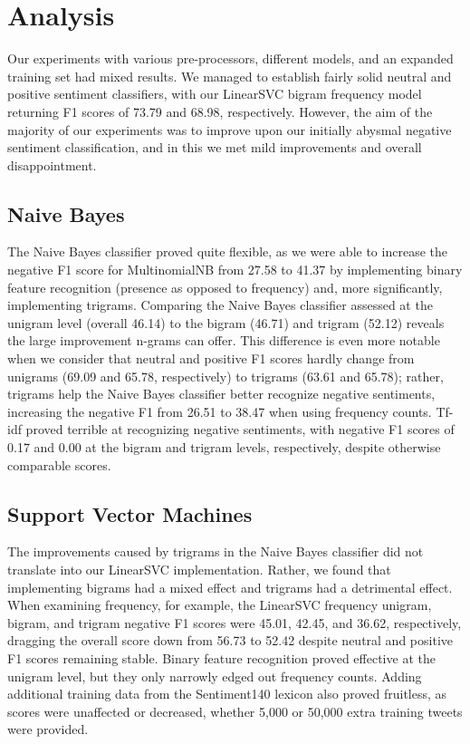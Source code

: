 \section{Analysis}
Our experiments with various pre-processors, different models, and an expanded training set had mixed results. We managed to establish fairly solid neutral and positive sentiment classifiers, with our LinearSVC bigram frequency model returning F1 scores of 73.79 and 68.98, respectively. However, the aim of the majority of our experiments was to improve upon our initially abysmal negative sentiment classification, and in this we met mild improvements and overall disappointment. 

\subsection{Naive Bayes}
The Naive Bayes classifier proved quite flexible, as we were able to increase the negative F1 score for MultinomialNB from 27.58 to 41.37 by implementing binary feature recognition (presence as opposed to frequency) and, more significantly, implementing trigrams. Comparing the Naive Bayes classifier assessed at the unigram level (overall 46.14) to the bigram (46.71) and trigram (52.12) reveals the large improvement n-grams can offer. This difference is even more notable when we consider that neutral and positive F1 scores hardly change from unigrams (69.09 and 65.78, respectively) to trigrams (63.61 and 65.78); rather, trigrams help the Naive Bayes classifier better recognize negative sentiments, increasing the negative F1 from 26.51 to 38.47 when using frequency counts. Tf-idf proved terrible at recognizing negative sentiments, with negative F1 scores of 0.17 and 0.00 at the bigram and trigram levels, respectively, despite otherwise comparable scores.

\subsection{Support Vector Machines}
The improvements caused by trigrams in the Naive Bayes classifier did not translate into our LinearSVC implementation. Rather, we found that implementing bigrams had a mixed effect and trigrams had a detrimental effect. When examining frequency, for example, the LinearSVC frequency unigram, bigram, and trigram negative F1 scores were 45.01, 42.45, and 36.62, respectively, dragging the overall score down from 56.73 to 52.42 despite neutral and positive F1 scores remaining stable. Binary feature recognition proved effective at the unigram level, but they only narrowly edged out frequency counts. Adding additional training data from the Sentiment140 lexicon also proved fruitless, as scores were unaffected or decreased, whether 5,000 or 50,000 extra training tweets were provided. 

